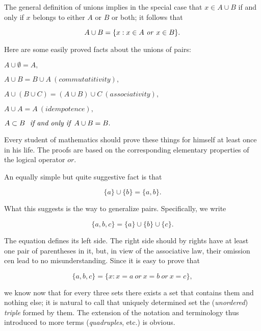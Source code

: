 The general definition of unions implies in the special case that $x \in A \cup B$ if and only if $x$ belongs to either $A$ or $B$ or both; it follows that 

\begin{equation*}
A \cup B = \{x: x \in A \text{ \textit{or} } x \in B \}.
\end{equation*}

Here are some easily proved facts about the unions of pairs:
\begin{center}
$A \cup \emptyset = A,$

$A \cup B =  B \cup A \: (commutatitivity),$

$A \cup (B \cup C) = (A \cup B) \cup C \: (associativity),$

$A \cup A = A \:(idempotence),$

$ A \subset B \text{ \textit{ if and only if} } A \cup B = B.$
\end{center}

Every student of mathematics should prove these things for himself at least once in his life. The proofs are based on the corresponding elementary properties of the logical operator $or$.

An equally simple but quite suggestive fact is that 

\begin{equation*}
\{ a \} \cup \{ b \} = \{ a, b \}.
\end{equation*}

What this suggests is the way to generalize pairs.   Specifically, we write 

\begin{equation*}
 \{ a, b, c \} = \{ a \} \cup \{ b \} \cup \{ c \}.
\end{equation*}

The equation defines its left side. The right side should by rights have at least one pair of parentheses in it, but, in view of the associative law, their omission cen lead to no misunderstanding. Since it is easy to prove that 

\begin{equation*}
 \{ a, b, c \} = \{ x: x = a \: or \: x = b \: or \: x = c \},
\end{equation*}

we know now that for every three sets there exists a set that contains them and nothing else; it is natural to call that uniquely determined set the (\textit{unordered}) \textit{triple} formed by them. The extension of the notation and terminology thus introduced to more terms (\textit{quadruples}, etc.) is obvious.

